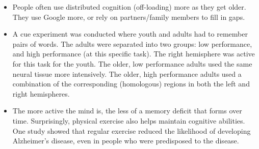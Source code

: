 \documentclass[]{article}
\begin{document}
\begin{itemize}
				\item People often use distributed cognition (off-loading) more as they get older. They use Google more, or rely on partners/family members to fill in gaps.
				\item A cue experiment was conducted where youth and adults had to remember pairs of words. The adults were separated into two groups: low performance, and high performance (at this specific task). The right hemisphere was active for this task for the youth. The older, low performance adults used the same neural tissue more intensively. The older, high performance adults used a combination of the corresponding (homologous) regions in both the left and right hemispheres.
				\item The more active the mind is, the less of a memory deficit that forms over time. Surprisingly, physical exercise also helps maintain cognitive abilities. One study showed that regular exercise reduced the likelihood of developing Alzheimer's disease, even in people who were predisposed to the disease.
			\end{itemize}
\end{document}
